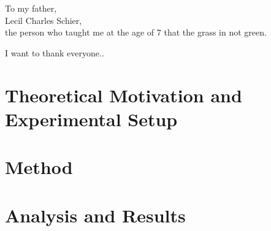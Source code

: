 \documentclass[11pt]{ucthesis}
\begin{document}
\begin{frontmatter}
\begin{abstract}
\end{abstract}

\begin{dedication}
\null\vfil
{\large
\begin{center}
To my father,\\\vspace{12pt}
Lecil Charles Schier,\\\vspace{12pt}
the person who taught me at the age of 7 that the grass in not green.
\end{center}}
\vfil\null
\end{dedication}


\begin{acknowledgements}
I want to thank everyone..
\end{acknowledgements}

\end{frontmatter}

\part{Theoretical Motivation and Experimental Setup}


\part{Method}






\part{Analysis and Results}






\nocite{*}



\appendix

\iffalse


Ancillary material should be put in appendices, which appear after the
bibliography. 
\fi
\end{document}
